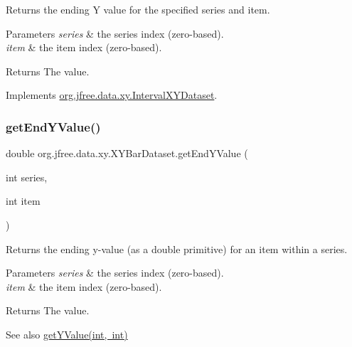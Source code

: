 Returns the ending Y value for the specified series and item.


\begin{DoxyParams}{Parameters}
{\em series} & the series index (zero-\/based). \\
\hline
{\em item} & the item index (zero-\/based).\\
\hline
\end{DoxyParams}
\begin{DoxyReturn}{Returns}
The value. 
\end{DoxyReturn}


Implements \mbox{\hyperlink{interfaceorg_1_1jfree_1_1data_1_1xy_1_1_interval_x_y_dataset_ae938af574bad07e7f47a8b423223ef9b}{org.\+jfree.\+data.\+xy.\+Interval\+X\+Y\+Dataset}}.

\mbox{\label{classorg_1_1jfree_1_1data_1_1xy_1_1_x_y_bar_dataset_a0d37cd7bac49afb6555e23d7d1ef1868}} 
\subsubsection{\texorpdfstring{get\+End\+Y\+Value()}{getEndYValue()}}
{\footnotesize\ttfamily double org.\+jfree.\+data.\+xy.\+X\+Y\+Bar\+Dataset.\+get\+End\+Y\+Value (\begin{DoxyParamCaption}\item[{int}]{series,  }\item[{int}]{item }\end{DoxyParamCaption})}

Returns the ending y-\/value (as a double primitive) for an item within a series.


\begin{DoxyParams}{Parameters}
{\em series} & the series index (zero-\/based). \\
\hline
{\em item} & the item index (zero-\/based).\\
\hline
\end{DoxyParams}
\begin{DoxyReturn}{Returns}
The value.
\end{DoxyReturn}
\begin{DoxySeeAlso}{See also}
\mbox{\hyperlink{classorg_1_1jfree_1_1data_1_1xy_1_1_x_y_bar_dataset_ad5f518543e018a6bc34cfe303bc9fa69}{get\+Y\+Value(int, int)}} 
\end{DoxySeeAlso}


